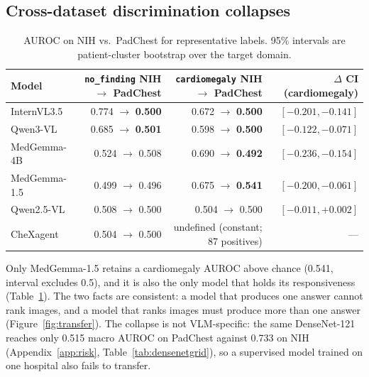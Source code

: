 \subsection{Cross-dataset discrimination collapses}
\label{sec:results-transfer}

\begin{table}[t]
\centering
\small
\caption{AUROC on NIH vs.\ PadChest for representative labels. 95\% intervals are patient-cluster bootstrap over the target domain.}
\label{tab:transfer}
\begin{tabular}{lrrr}
\toprule
Model & \texttt{no\_finding} NIH $\rightarrow$ PadChest & \texttt{cardiomegaly} NIH $\rightarrow$ PadChest & $\Delta$ CI (cardiomegaly) \\
\midrule
InternVL3.5 & 0.774 $\rightarrow$ \textbf{0.500} & 0.672 $\rightarrow$ \textbf{0.500} & $[-0.201,-0.141]$ \\
Qwen3-VL & 0.685 $\rightarrow$ \textbf{0.501} & 0.598 $\rightarrow$ \textbf{0.500} & $[-0.122,-0.071]$ \\
MedGemma-4B & 0.524 $\rightarrow$ 0.508 & 0.690 $\rightarrow$ \textbf{0.492} & $[-0.236,-0.154]$ \\
MedGemma-1.5 & 0.499 $\rightarrow$ 0.496 & 0.675 $\rightarrow$ \textbf{0.541} & $[-0.200,-0.061]$ \\
Qwen2.5-VL & 0.508 $\rightarrow$ 0.500 & 0.504 $\rightarrow$ 0.500 & $[-0.011,+0.002]$ \\
CheXagent & 0.504 $\rightarrow$ 0.500 & undefined (constant; 87 positives) & --- \\
\bottomrule
\end{tabular}
\end{table}

Only MedGemma-1.5 retains a cardiomegaly AUROC above chance (0.541, interval excludes 0.5), and it is also the only model that holds its responsiveness (Table~\ref{tab:transfer}). The two facts are consistent: a model that produces one answer cannot rank images, and a model that ranks images must produce more than one answer (Figure~\ref{fig:transfer}). The collapse is not VLM-specific: the same DenseNet-121 reaches only 0.515 macro AUROC on PadChest against 0.733 on NIH (Appendix~\ref{app:risk}, Table~\ref{tab:densenetgrid}), so a supervised model trained on one hospital also fails to transfer.

